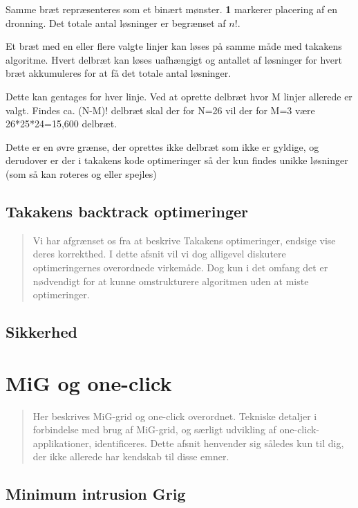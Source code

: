 \documentclass[draft,a4paper,10pt]{article}
\begin{document}
Samme bræt repræsenteres som et binært mønster. \textbf{1} markerer placering af en dronning. Det totale antal løsninger er begrænset af $n!$. 

Et bræt med en eller flere valgte linjer kan løses på samme måde med takakens algoritme. Hvert delbræt kan løses uafhængigt og antallet af løsninger for hvert bræt akkumuleres for at få det totale antal løsninger.

Dette kan gentages for hver linje. Ved at oprette delbræt hvor M linjer allerede er valgt. Findes ca. (N-M)! delbræt skal der for N=26 vil der for M=3 være 26*25*24=15,600 delbræt.

Dette er en øvre grænse, der oprettes ikke delbræt som ikke er gyldige, og derudover er der i takakens kode optimeringer så der kun findes unikke løsninger (som så kan roteres og eller spejles)






\subsection{Takakens backtrack optimeringer}\label{backtrackoptimeringer}
\begin{verse}
	Vi har afgrænset os fra at beskrive Takakens optimeringer, endsige vise deres korrekthed. I dette afsnit vil vi dog alligevel diskutere optimeringernes overordnede virkemåde. Dog kun i det omfang det er nødvendigt for at kunne omstrukturere algoritmen uden at miste optimeringer.   
\end{verse}




\subsection{Sikkerhed}

\section{MiG og one-click}\label{migogoneclick}
\begin{verse}
	Her beskrives MiG-grid og one-click overordnet. Tekniske detaljer i forbindelse med brug af MiG-grid, og særligt udvikling af one-click-applikationer, identificeres. Dette afsnit henvender sig således kun til dig, der ikke allerede har kendskab til disse emner.  
\end{verse}

\subsection{Minimum intrusion Grig}\label{mig}
\end{document}
